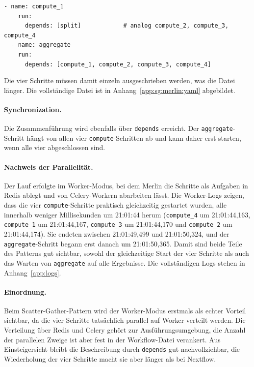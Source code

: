 \begin{lstlisting}[caption={Fan-out und Fan-in über depends (Merlin, Scatter-Gather)},label={lst:sg:me:depends}]
  - name: compute_1
    run:
      depends: [split]            # analog compute_2, compute_3, compute_4 
  - name: aggregate
    run:
      depends: [compute_1, compute_2, compute_3, compute_4]
\end{lstlisting}

Die vier Schritte müssen damit einzeln ausgeschrieben werden, was die Datei länger. Die vollständige Datei ist in
Anhang~\ref{app:sg:merlin:yaml} abgebildet.

\paragraph{Synchronization.}
Die Zusammenführung wird ebenfalls über \texttt{depends} erreicht. Der \texttt{aggregate}-Schritt
hängt von allen vier \texttt{compute}-Schritten ab und kann daher erst starten, wenn alle vier
abgeschlossen sind.

\paragraph{Nachweis der Parallelität.}
Der Lauf erfolgte im Worker-Modus, bei dem Merlin die Schritte als Aufgaben in Redis ablegt und von
Celery-Workern abarbeiten lässt. Die Worker-Logs zeigen, dass die vier \texttt{compute}-Schritte
praktisch gleichzeitig gestartet wurden, alle innerhalb weniger Millisekunden um 21:01:44 herum
(\texttt{compute\_4} um 21:01:44,163, \texttt{compute\_1} um 21:01:44,167, \texttt{compute\_3} um
21:01:44,170 und \texttt{compute\_2} um 21:01:44,174). Sie endeten zwischen 21:01:49,499 und
21:01:50,324, und der \texttt{aggregate}-Schritt begann erst danach um 21:01:50,365. Damit sind
beide Teile des Patterns gut sichtbar, sowohl der gleichzeitige Start der vier Schritte als auch das
Warten von \texttt{aggregate} auf alle Ergebnisse. Die vollständigen Logs stehen in
Anhang~\ref{app:logs}.

\paragraph{Einordnung.}
Beim Scatter-Gather-Pattern wird der Worker-Modus erstmals als echter Vorteil sichtbar, da die vier
Schritte tatsächlich parallel auf Worker verteilt werden. Die Verteilung über Redis und Celery
gehört zur Ausführungsumgebung, die Anzahl der parallelen Zweige ist aber fest in der Workflow-Datei
verankert. Aus Einsteigersicht bleibt die Beschreibung durch \texttt{depends} gut nachvollziehbar,
die Wiederholung der vier Schritte macht sie aber länger als bei Nextflow.

